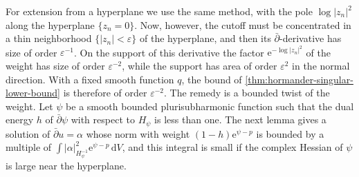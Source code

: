 For extension from a hyperplane we use the same method, with the pole $\log|z_n|^2$ along the hyperplane $\{z_n=0\}$. Now, however, the cutoff must be concentrated in a thin neighborhood $\{|z_n|<\varepsilon\}$ of the hyperplane, and then its $\bar\partial$-derivative has size of order $\varepsilon^{-1}$. On the support of this derivative the factor $\mathrm e^{-\log|z_n|^2}$ of the weight has size of order $\varepsilon^{-2}$, while the support has area of order $\varepsilon^2$ in the normal direction. With a fixed smooth function $q$, the bound of \cref{thm:hormander-singular-lower-bound} is therefore of order $\varepsilon^{-2}$. The remedy is a bounded twist of the weight. Let $\psi$ be a smooth bounded plurisubharmonic function such that the dual energy $h$ of $\bar\partial\psi$ with respect to $H_\psi$ is less than one. The next lemma gives a solution of $\bar\partial u=\alpha$ whose norm with weight $(1-h)\mathrm e^{\psi-p}$ is bounded by a multiple of $\int|\alpha|_{H_\psi^{-1}}^2\mathrm e^{\psi-p}\,\mathrm dV$, and this integral is small if the complex Hessian of $\psi$ is large near the hyperplane.

